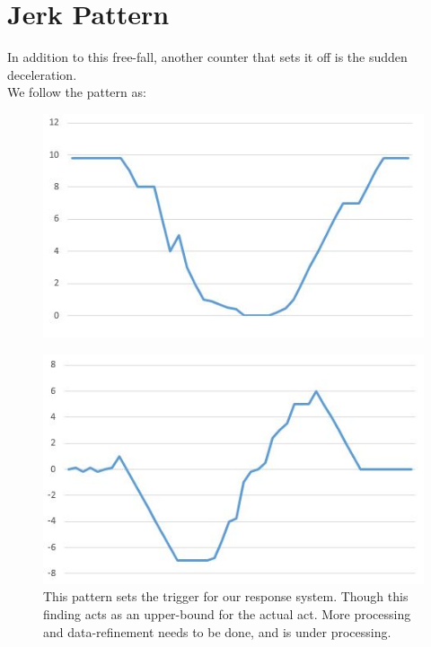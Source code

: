\begin{figure}[h]
\label{fig:multiRH02}
\end{figure}
\clearpage

\section{Jerk Pattern}
\label{sec:sec04}
In addition to this free-fall, another counter that sets it off is the sudden deceleration. \\
We follow the pattern as: \\

\begin{figure}[h]
\centering
\includegraphics[height=0.35\textheight]{fig01/g_fall_G}
	\label{fig:RHP01}

\end{figure}

\begin{figure}[!b]

\centering
\includegraphics[height=0.35\textheight]{fig01/g_fall_A}
	\label{fig:RHP02}
This pattern sets the trigger for our response system. Though this finding acts as an upper-bound for the actual act. More processing and data-refinement needs to be done, and is under processing.
\end{figure}

